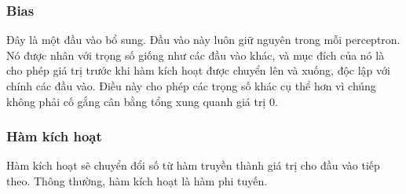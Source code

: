 \subsubsection{Bias}
Đây là một đầu vào bổ sung. Đầu vào này luôn giữ nguyên trong mỗi perceptron. Nó được nhân với trọng số giống như các đầu vào khác, và mục đích của nó là cho phép giá trị trước khi hàm kích hoạt được chuyển lên và xuống, độc lập với chính các đầu vào. Điều này cho phép các trọng số khác cụ thể hơn vì chúng không phải cố gắng cân bằng tổng xung quanh giá trị 0.

\subsubsection{Hàm kích hoạt}
Hàm kích hoạt sẽ chuyển đổi số từ hàm truyền thành giá trị cho đầu vào tiếp theo. Thông thường, hàm kích hoạt là hàm phi tuyến. 